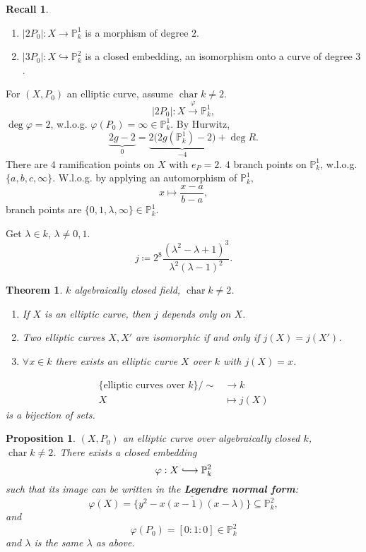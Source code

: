 \documentclass[12pt]{article}
\DeclareMathOperator{\chara}{char}
\newtheorem*{proposition}{Proposition}
\newtheorem*{theorem}{Theorem}
\theoremstyle{definition}
\newtheorem*{recall}{Recall}
\theoremstyle{remark}
\begin{document}
\begin{recall}
\begin{enumerate}[label=\arabic*)]
\item $|2P_0|:X\rightarrow\mathbb{P}_k^1$ is a morphism of degree $2$.

\item $|3P_0|:X\hookrightarrow\mathbb{P}_k^2$ is a closed embedding, an isomorphism onto a curve of degree $3$.
\end{enumerate}
\end{recall}

For $(X,P_0)$ an elliptic curve, assume $\chara k\neq2$.
\[|2P_0|:X\overset{\varphi}{\longrightarrow}\mathbb{P}_k^1,\]
$\deg\varphi=2$, w.l.o.g. $\varphi(P_0)=\infty\in\mathbb{P}_k^1$. By Hurwitz,
\[\underbrace{2g-2}_0=\underbrace{2\big(2g(\mathbb{P}_k^1)-2\big)}_{-4}+\deg R.\]
There are $4$ ramification points on $X$ with $e_P=2$. $4$ branch points on $\mathbb{P}_k^1$, w.l.o.g. $\{a,b,c,\infty\}$. W.l.o.g. by applying an automorphism of $\mathbb{P}_k^1$,
\[x\longmapsto\frac{x-a}{b-a},\]
branch points are $\{0,1,\lambda,\infty\}\in\mathbb{P}_k^1$.

Get $\lambda\in k$, $\lambda\neq0,1$.
\[j\coloneqq2^8\frac{(\lambda^2-\lambda+1)^3}{\lambda^2(\lambda-1)^2}.\]

\begin{theorem}
$k$ algebraically closed field, $\chara k\neq2$.

\begin{enumerate}[label=\arabic*)]
\item If $X$ is an elliptic curve, then $j$ depends only on $X$.

\item Two elliptic curves $X,X'$ are isomorphic if and only if $j(X)=j(X')$.

\item $\forall x\in k$ there exists an elliptic curve $X$ over $k$ with $j(X)=x$.
\end{enumerate}
\begin{align*}
\{\text{elliptic curves over }k\}\big/\sim&\longrightarrow k\\
X&\longmapsto j(X)
\end{align*}
is a bijection of sets.
\end{theorem}

\begin{proposition}
$(X,P_0)$ an elliptic curve over algebraically closed $k$, $\chara k\neq2$. There exists a closed embedding
\[\varphi:X\lhook\joinrel\longrightarrow\mathbb{P}_k^2\]
such that its image can be written in the \textbf{Legendre normal form}:
\[\varphi(X)=\overline{\{y^2-x(x-1)(x-\lambda)\}}\subseteq\mathbb{P}_k^2,\]
and
\[\varphi(P_0)=[0:1:0]\in\mathbb{P}_k^2\]
and $\lambda$ is the same $\lambda$ as above.
\end{proposition}
\end{document}
